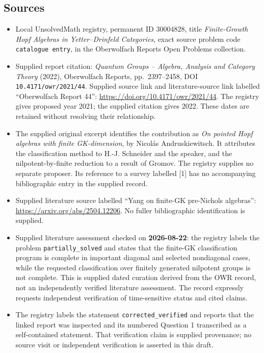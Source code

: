 \documentclass[11pt]{article}
\begin{document}
\subsection{Sources}
\begin{itemize}
\item Local UnsolvedMath registry, permanent ID \(30004828\), title \emph{Finite-Growth Hopf Algebras in Yetter--Drinfeld Categories}, exact source problem code \texttt{catalogue entry}, in the Oberwolfach Reports Open Problems collection.
\item Supplied report citation: \emph{Quantum Groups -- Algebra, Analysis and Category Theory} (2022), Oberwolfach Reports, pp.~2397--2458, DOI \texttt{10.4171/owr/2021/44}. Supplied source link and literature-source link labelled ``Oberwolfach Report 44'': \url{https://doi.org/10.4171/owr/2021/44}. The registry gives proposed year 2021; the supplied citation gives 2022. These dates are retained without resolving their relationship.
\item The supplied original excerpt identifies the contribution as \emph{On pointed Hopf algebras with finite GK-dimension}, by Nicol\'as Andruskiewitsch. It attributes the classification method to H.-J. Schneider and the speaker, and the nilpotent-by-finite reduction to a result of Gromov. The registry supplies no separate proposer. Its reference to a survey labelled [1] has no accompanying bibliographic entry in the supplied record.
\item Supplied literature source labelled ``Yang on finite-GK pre-Nichols algebras'': \url{https://arxiv.org/abs/2504.12206}. No fuller bibliographic identification is supplied.
\item Supplied literature assessment checked on \textbf{2026-08-22}: the registry labels the problem \texttt{partially\_solved} and states that the finite-GK classification program is complete in important diagonal and selected nondiagonal cases, while the requested classification over finitely generated nilpotent groups is not complete. This is supplied dated curation derived from the OWR record, not an independently verified literature assessment. The record expressly requests independent verification of time-sensitive status and cited claims.
\item The registry labels the statement \texttt{corrected\_verified} and reports that the linked report was inspected and its numbered Question 1 transcribed as a self-contained statement. That verification claim is supplied provenance; no source visit or independent verification is asserted in this draft.
\end{itemize}
\end{document}
